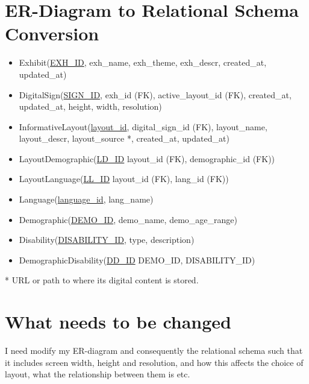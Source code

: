 \documentclass{exam}
\begin{document}
\section*{ER-Diagram to Relational Schema Conversion}
\bigskip
\begin{itemize}
\item Exhibit(\underline{EXH\_ID}, exh\_name, exh\_theme, exh\_descr, created\_at, updated\_at)

\item DigitalSign(\underline{SIGN\_ID}, exh\_id (FK), active\_layout\_id (FK), created\_at, updated\_at, height, width, resolution)

\item InformativeLayout(\underline{layout\_id}, digital\_sign\_id (FK), layout\_name, layout\_descr, layout\_source *, created\_at, updated\_at)

\item LayoutDemographic(\underline{LD\_ID} layout\_id (FK), demographic\_id (FK))

\item LayoutLanguage(\underline{LL\_ID} layout\_id (FK), lang\_id (FK))

\item Language(\underline{language\_id}, lang\_name)

\item Demographic(\underline{DEMO\_ID}, demo\_name, demo\_age\_range)

\item Disability(\underline{DISABILITY\_ID}, type, description)

\item DemographicDisability(\underline{DD\_ID} DEMO\_ID, DISABILITY\_ID)
\end{itemize}
\bigskip
* URL or path to where its digital content is stored.

\pagebreak
\section*{What needs to be changed}
\bigskip
I need modify my ER-diagram and consequently the relational schema such that it includes screen width, height and resolution, and how this affects the choice of layout, what the relationship between them is etc.\\
\bigskip
\end{document}
